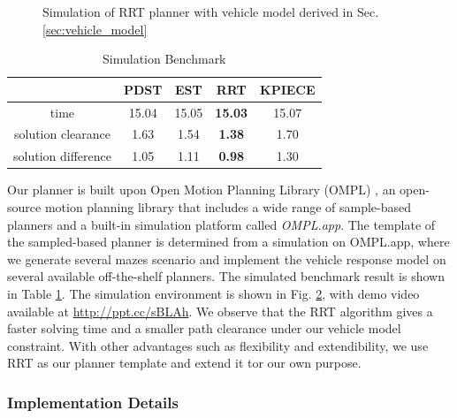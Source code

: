 \documentclass[../thesis.tex]{subfiles}
\begin{document}
\begin{figure}[t]
\begin{subfigure}[b]{0.3\linewidth}
		\subcaption{}
		\label{fig:rrt-sim-maze2}
	\end{subfigure}
	\caption{Simulation of RRT planner with vehicle model derived in Sec. \ref{sec:vehicle_model}}
    \label{fig:rrt-sim-maze}
\end{figure}


\begin{table}[t]
	\centering
	\caption{Simulation Benchmark}
	\label{table:simulation-benchmark}
	\begin{small}
	\begin{sc}
	\begin{tabular}{ccccc}
		\toprule 
			& PDST \cite{ladd2005motion} & EST \cite{hsu1997path} & RRT \cite{kuffner2000rrt} & KPIECE \cite{csucan2009kinodynamic} \\
		\midrule \midrule
		time & 15.04 & 15.05 & \textbf{15.03} & 15.07 \\
		solution clearance & 1.63 & 1.54 & \textbf{1.38} & 1.70 \\
		solution difference & 1.05 & 1.11 & \textbf{0.98} & 1.30 \\
		\toprule
	\end{tabular}
	\end{sc}
	\end{small}
\end{table}

Our planner is built upon Open Motion Planning Library (OMPL) \cite{sucan2012the-open-motion-planning-library}, an open-source motion planning library that includes a wide range of sample-based planners and a built-in simulation platform called \textit{OMPL.app}. 
The template of the sampled-based planner is determined from a simulation on OMPL.app, where we generate several mazes scenario and implement the vehicle response model on several available off-the-shelf planners. The simulated benchmark result is shown in Table \ref{table:simulation-benchmark}. The simulation environment is shown in Fig. \ref{fig:rrt-sim-maze}, with demo video available at \url{http://ppt.cc/sBLAh}. We observe that the RRT algorithm gives a faster solving time and a smaller path clearance under our vehicle model constraint. With other advantages such as flexibility and extendibility, we use RRT as our planner template and extend it tor our own purpose.


\subsubsection{Implementation Details}
\end{document}
